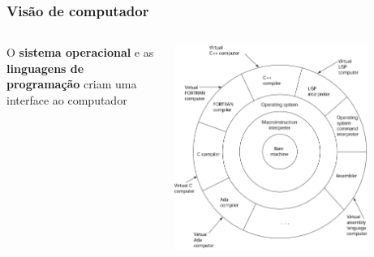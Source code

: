 \documentclass[xcolor={usenames,dvipsnames},10pt,presentation,aspectratio=169]{beamer}
\begin{document}
\begin{frame}
  \frametitle{Visão de computador}
    \begin{columns}
      \begin{column}{0.4\textwidth}
      \raggedleft
        O \textbf{sistema operacional} e as \textbf{linguagens de programação} criam uma interface ao computador
     \end{column}
      \begin{column}{0.6\textwidth}
  \begin{center}
	\includegraphics[width=0.8\textwidth]{vm.png}
  \end{center}
      \end{column}
    \end{columns}
\end{frame}
\end{document}
